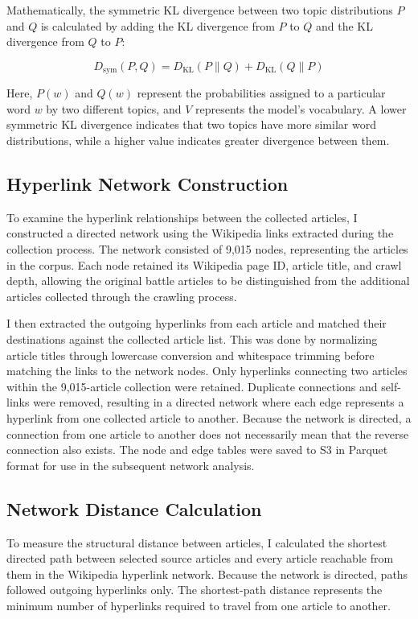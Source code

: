 \documentclass[
  letterpaper,
  DIV=11,
  numbers=noendperiod]{scrartcl}
\begin{document}
Mathematically, the symmetric KL divergence between two topic
distributions \(P\) and \(Q\) is calculated by adding the KL divergence
from \(P\) to \(Q\) and the KL divergence from \(Q\) to \(P\):

\[
D_{\mathrm{sym}}(P,Q) =
D_{\mathrm{KL}}(P \parallel Q) +
D_{\mathrm{KL}}(Q \parallel P)
\]

Here, \(P(w)\) and \(Q(w)\) represent the probabilities assigned to a
particular word \(w\) by two different topics, and \(V\) represents the
model's vocabulary. A lower symmetric KL divergence indicates that two
topics have more similar word distributions, while a higher value
indicates greater divergence between them.

\subsection{Hyperlink Network
Construction}\label{hyperlink-network-construction}

To examine the hyperlink relationships between the collected articles, I
constructed a directed network using the Wikipedia links extracted
during the collection process. The network consisted of 9,015 nodes,
representing the articles in the corpus. Each node retained its
Wikipedia page ID, article title, and crawl depth, allowing the original
battle articles to be distinguished from the additional articles
collected through the crawling process.

I then extracted the outgoing hyperlinks from each article and matched
their destinations against the collected article list. This was done by
normalizing article titles through lowercase conversion and whitespace
trimming before matching the links to the network nodes. Only hyperlinks
connecting two articles within the 9,015-article collection were
retained. Duplicate connections and self-links were removed, resulting
in a directed network where each edge represents a hyperlink from one
collected article to another. Because the network is directed, a
connection from one article to another does not necessarily mean that
the reverse connection also exists. The node and edge tables were saved
to S3 in Parquet format for use in the subsequent network analysis.

\subsection{Network Distance
Calculation}\label{network-distance-calculation}

To measure the structural distance between articles, I calculated the
shortest directed path between selected source articles and every
article reachable from them in the Wikipedia hyperlink network. Because
the network is directed, paths followed outgoing hyperlinks only. The
shortest-path distance represents the minimum number of hyperlinks
required to travel from one article to another.
\end{document}
